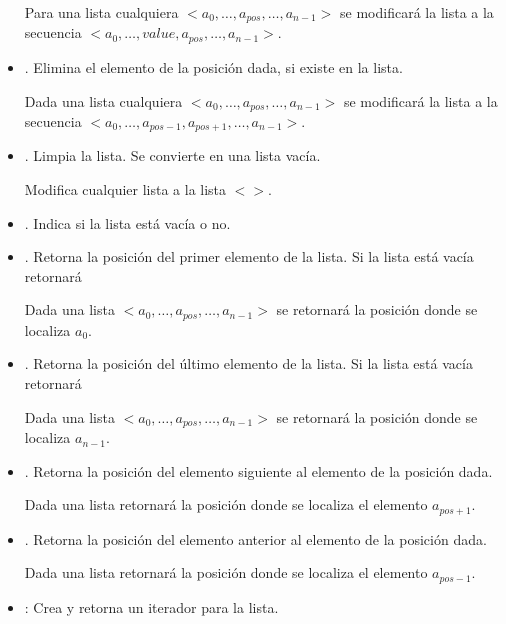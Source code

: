 \begin{definition}[Lista]{}
\begin{itemize}
Para una lista cualquiera $<a_0, \ldots, a_{pos}, \ldots, a_{n-1}>$ se modificará la lista a la secuencia $<a_0, \ldots, value, a_{pos}, \ldots, a_{n-1}>$.


\item {}. Elimina el elemento de la posición dada, si existe en la lista.

Dada una lista cualquiera $<a_0, \ldots, a_{pos}, \ldots, a_{n-1}>$ se modificará la lista a la secuencia $<a_0, \ldots, a_{pos-1},a_{pos+1},\ldots, a_{n-1}>$.


\item {}. Limpia la lista. Se convierte en una lista vacía.

Modifica cualquier lista a la lista  $<>$.

\item {}. Indica si la lista está vacía o no.

\item {}. Retorna la posición del primer elemento de la lista. Si la lista está vacía retornará  

Dada una lista  $<a_0, \ldots, a_{pos}, \ldots, a_{n-1}>$ se retornará la posición donde se localiza $a_0$.

\item {}. Retorna la posición del último elemento de la lista. Si la lista está vacía retornará  

Dada una lista  $<a_0, \ldots, a_{pos}, \ldots, a_{n-1}>$ se retornará la posición donde se localiza $a_{n-1}$.

\item {}. Retorna la posición del elemento siguiente al elemento de la posición dada.

Dada una lista retornará la posición donde se localiza el elemento $a_{pos+1}$.

\item {}. Retorna la posición del elemento anterior al elemento de la posición dada.

Dada una lista retornará la posición donde se localiza el elemento $a_{pos-1}$.


\item {}: Crea y retorna un iterador para la lista.
\end{itemize}
\end{definition}

